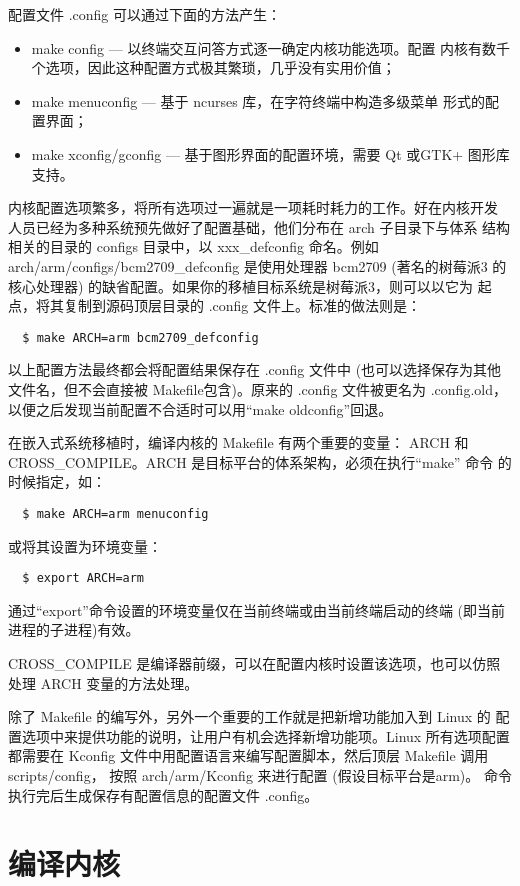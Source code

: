 配置文件 .config 可以通过下面的方法产生：
\begin{itemize}
    \item make config --- 以终端交互问答方式逐一确定内核功能选项。配置
        内核有数千个选项，因此这种配置方式极其繁琐，几乎没有实用价值；
    \item make menuconfig --- 基于 ncurses 库，在字符终端中构造多级菜单
        形式的配置界面；
    \item make xconfig/gconfig --- 基于图形界面的配置环境，需要 Qt 或GTK+
        图形库支持。
\end{itemize}
内核配置选项繁多，将所有选项过一遍就是一项耗时耗力的工作。好在内核开发
人员已经为多种系统预先做好了配置基础，他们分布在 arch 子目录下与体系
结构相关的目录的 configs 目录中，以 xxx\_defconfig 命名。例如
arch/arm/configs/bcm2709\_defconfig 是使用处理器 bcm2709 (著名的树莓派3
的核心处理器) 的缺省配置。如果你的移植目标系统是树莓派3，则可以以它为
起点，将其复制到源码顶层目录的 .config 文件上。标准的做法则是：
\begin{verbatim}
  $ make ARCH=arm bcm2709_defconfig
\end{verbatim}

以上配置方法最终都会将配置结果保存在 .config 文件中 (也可以选择保存为其他
文件名，但不会直接被 Makefile包含)。原来的 .config 文件被更名为
.config.old，以便之后发现当前配置不合适时可以用``make oldconfig''回退。

在嵌入式系统移植时，编译内核的 Makefile 有两个重要的变量：
ARCH 和 CROSS\_COMPILE。ARCH 是目标平台的体系架构，必须在执行``make'' 命令
的时候指定，如：
\begin{verbatim}
  $ make ARCH=arm menuconfig
\end{verbatim}
或将其设置为环境变量：
\begin{verbatim}
  $ export ARCH=arm
\end{verbatim}
通过``export''命令设置的环境变量仅在当前终端或由当前终端启动的终端
(即当前进程的子进程)有效。

CROSS\_COMPILE 是编译器前缀，可以在配置内核时设置该选项，也可以仿照
处理 ARCH 变量的方法处理。

除了 Makefile 的编写外，另外一个重要的工作就是把新增功能加入到 Linux 的
配置选项中来提供功能的说明，让用户有机会选择新增功能项。Linux 所有选项配置
都需要在 Kconfig 文件中用配置语言来编写配置脚本，然后顶层 Makefile 调用
scripts/config， 按照 arch/arm/Kconfig 来进行配置 (假设目标平台是arm)。
命令执行完后生成保存有配置信息的配置文件 .config。

\section{编译内核}
